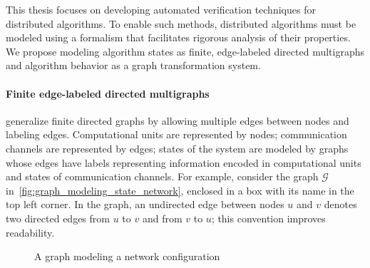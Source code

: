 This thesis focuses on developing automated verification techniques for distributed algorithms. 
To enable such methods, distributed algorithms must be modeled using a formalism that facilitates rigorous analysis of their properties. We propose modeling algorithm states as finite, edge-labeled directed multigraphs and algorithm behavior as a graph transformation system. 

\paragraph{Finite edge-labeled directed multigraphs} generalize finite directed graphs by allowing multiple edges between nodes and labeling edges. Computational units are represented by nodes; communication channels are represented by edges; states of the system are modeled by graphs whose edges have labels representing information encoded in computational units and states of communication channels. For example, consider the graph $\mathcal{G}$ in~\autoref{fig:graph_modeling_state_network}, enclosed in a box with its name in the top left corner. 
In the graph, an undirected edge between nodes $u$ and $v$ denotes two directed edges from $u$ to $v$ and from $v$ to $u$; this convention improves readability.
\begin{figure}[!ht]
        \centering
    \caption{A graph modeling a network configuration}
    \label{fig:graph_modeling_state_network}
\end{figure}
